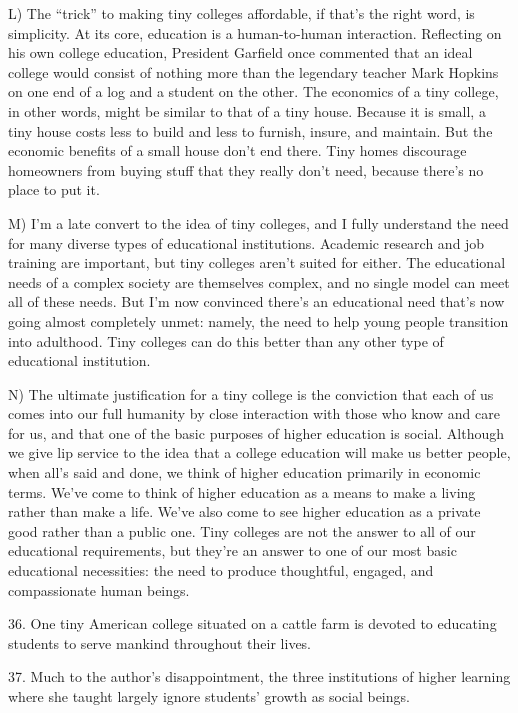 \documentclass[UTF8,11pt]{ctexart}
\begin{document}
L) The “trick” to making tiny colleges affordable, if that’s the right word, is simplicity. At its core, education is a human-to-human interaction. Reflecting on his own college education, President Garfield once commented that an ideal college would consist of nothing more than the legendary teacher Mark Hopkins on one end of a log and a student on the other. The economics of a tiny college, in other words, might be similar to that of a tiny house. Because it is small, a tiny house costs less to build and less to furnish, insure, and maintain. But the economic benefits of a small house don’t end there. Tiny homes discourage homeowners from buying stuff that they really don’t need, because there’s no place to put it.


M) I’m a late convert to the idea of tiny colleges, and I fully understand the need for many diverse types of educational institutions. Academic research and job training are important, but tiny colleges aren’t suited for either. The educational needs of a complex society are themselves complex, and no single model can meet all of these needs. But I’m now convinced there’s an educational need that’s now going almost completely unmet: namely, the need to help young people transition into adulthood. Tiny colleges can do this better than any other type of educational institution.


N) The ultimate justification for a tiny college is the conviction that each of us comes into our full humanity by close interaction with those who know and care for us, and that one of the basic purposes of higher education is social. Although we give lip service to the idea that a college education will make us better people, when all’s said and done, we think of higher education primarily in economic terms. We’ve come to think of higher education as a means to make a living rather than make a life. We’ve also come to see higher education as a private good rather than a public one. Tiny colleges are not the answer to all of our educational requirements, but they’re an answer to one of our most basic educational necessities: the need to produce thoughtful, engaged, and compassionate human beings.


36. One tiny American college situated on a cattle farm is devoted to educating students to serve mankind throughout their lives.


37. Much to the author’s disappointment, the three institutions of higher learning where she taught largely ignore students’ growth as social beings.
\end{document}
